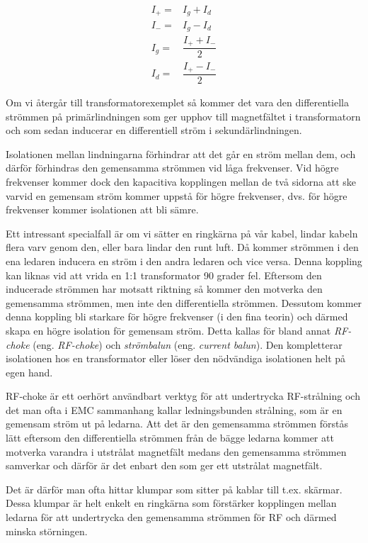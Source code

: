 \begin{eqnarray}
I_+ = & I_g + I_d\\
I_- = & I_g - I_d\\
I_g = & \dfrac{I_+ + I_-}{2}\\
I_d = & \dfrac{I_+ - I_-}{2}
\end{eqnarray}

Om vi återgår till transformatorexemplet så kommer det vara den differentiella
strömmen på primärlindningen som ger upphov till magnetfältet i transformatorn
och som sedan inducerar en differentiell ström i sekundärlindningen.

Isolationen mellan lindningarna förhindrar att det går en ström mellan dem,
och därför förhindras den gemensamma strömmen vid låga frekvenser.
Vid högre frekvenser kommer dock den kapacitiva kopplingen mellan de två
sidorna att ske varvid en gemensam ström kommer uppstå för högre frekvenser,
dvs. för högre frekvenser kommer isolationen att bli sämre.

Ett intressant specialfall är om vi sätter en ringkärna på vår kabel, lindar
kabeln flera varv genom den, eller bara lindar den runt luft.
Då kommer strömmen i den ena ledaren inducera en ström i den andra ledaren och
vice versa.
Denna koppling kan liknas vid att vrida en 1:1 transformator 90 grader fel.
Eftersom den inducerade strömmen har motsatt riktning så kommer den motverka
den gemensamma strömmen, men inte den differentiella strömmen. Dessutom kommer
denna koppling bli starkare för högre frekvenser (i den fina teorin) och
därmed skapa en högre isolation för gemensam ström.
Detta kallas för bland annat \emph{RF-choke} (eng. \emph{RF-choke}) och
\emph{strömbalun} (eng. \emph{current balun}).
Den kompletterar isolationen hos en transformator eller löser den nödvändiga
isolationen helt på egen hand.

RF-choke är ett oerhört användbart verktyg för att undertrycka RF-strålning
och det man ofta i EMC sammanhang kallar ledningsbunden strålning, som är en
gemensam ström ut på ledarna.
Att det är den gemensamma strömmen förstås lätt eftersom den differentiella
strömmen från de bägge ledarna kommer att motverka varandra i utstrålat
magnetfält medans den gemensamma strömmen samverkar och därför är det enbart
den som ger ett utstrålat magnetfält.

Det är därför man ofta hittar klumpar som sitter på kablar till t.ex. skärmar.
Dessa klumpar är helt enkelt en ringkärna som förstärker kopplingen mellan
ledarna för att undertrycka den gemensamma strömmen för RF och därmed minska
störningen.

